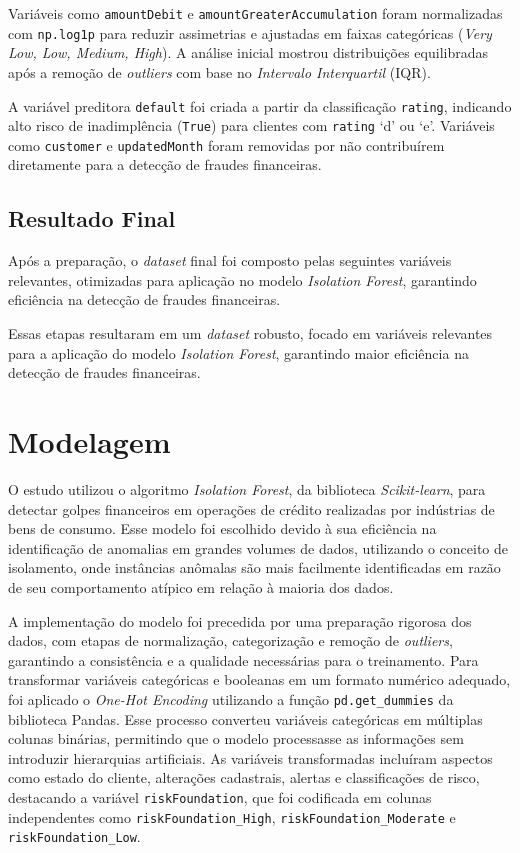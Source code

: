 \documentclass[12pt,a4paper]{article}
\begin{document}
Variáveis como \texttt{amountDebit} e \texttt{amountGreaterAccumulation} foram normalizadas com \texttt{np.log1p} para reduzir assimetrias e ajustadas em faixas categóricas (\textit{Very Low, Low, Medium, High}). A análise inicial mostrou distribuições equilibradas após a remoção de \textit{outliers} com base no \textit{Intervalo Interquartil} (IQR).

A variável preditora \texttt{default} foi criada a partir da classificação \texttt{rating}, indicando alto risco de inadimplência (\texttt{True}) para clientes com \texttt{rating} `d' ou `e'. Variáveis como \texttt{customer} e \texttt{updatedMonth} foram removidas por não contribuírem diretamente para a detecção de fraudes financeiras.

\subsection{Resultado Final}

Após a preparação, o \textit{dataset} final foi composto pelas seguintes variáveis relevantes, otimizadas para aplicação no modelo \textit{Isolation Forest}, garantindo eficiência na detecção de fraudes financeiras.


Essas etapas resultaram em um \textit{dataset} robusto, focado em variáveis relevantes para a aplicação do modelo \textit{Isolation Forest}, garantindo maior eficiência na detecção de fraudes financeiras.


\section{Modelagem}

O estudo utilizou o algoritmo \textit{Isolation Forest}, da biblioteca \textit{Scikit-learn}, para detectar golpes financeiros em operações de crédito realizadas por indústrias de bens de consumo. Esse modelo foi escolhido devido à sua eficiência na identificação de anomalias em grandes volumes de dados, utilizando o conceito de isolamento, onde instâncias anômalas são mais facilmente identificadas em razão de seu comportamento atípico em relação à maioria dos dados.

A implementação do modelo foi precedida por uma preparação rigorosa dos dados, com etapas de normalização, categorização e remoção de \textit{outliers}, garantindo a consistência e a qualidade necessárias para o treinamento. Para transformar variáveis categóricas e booleanas em um formato numérico adequado, foi aplicado o \textit{One-Hot Encoding} utilizando a função \texttt{pd.get\_dummies} da biblioteca Pandas. Esse processo converteu variáveis categóricas em múltiplas colunas binárias, permitindo que o modelo processasse as informações sem introduzir hierarquias artificiais. As variáveis transformadas incluíram aspectos como estado do cliente, alterações cadastrais, alertas e classificações de risco, destacando a variável \texttt{riskFoundation}, que foi codificada em colunas independentes como \texttt{riskFoundation\_High}, \texttt{riskFoundation\_Moderate} e \texttt{riskFoundation\_Low}.
\end{document}
